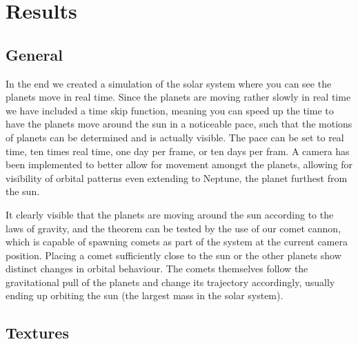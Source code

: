 \section{Results}

\subsection{General}
In the end we created a simulation of the solar system where you can see the planets move in real time. Since the planets are moving rather slowly in real time we have included a time skip function, meaning you can speed up the time to have the planets move around the sun in a noticeable pace, such that the motions of planets can be determined and is actually visible. The pace can be set to real time, ten times real time, one day per frame, or ten days per fram. A camera has been implemented to better allow for movement amongst the planets, allowing for visibility of orbital patterns even extending to Neptune, the planet furthest from the sun.
 
It clearly visible that the planets are moving around the sun according to the laws of gravity, and the theorem can be tested by the use of our comet cannon, which is capable of spawning comets as part of the system at the current camera position. Placing a comet sufficiently close to the sun or the other planets show distinct changes in orbital behaviour. The comets themselves follow the gravitational pull of the planets and change its trajectory accordingly, usually ending up orbiting the sun (the largest mass in the solar system).

\subsection{Textures}
